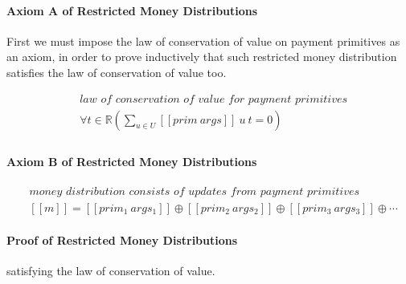 \paragraph{Axiom A of Restricted Money Distributions}

First we must impose the law of conservation of value on payment primitives as an axiom, in order to prove inductively
that such restricted money distribution satisfies the law of conservation of value too.

\begin{equation}
    \begin{split}
        &\textit{law of conservation of value for payment primitives} \\
        &\forall t \in \mathbb{R} ({\displaystyle \sum_{u \in U} [\![prim\ args]\!]\ u\ t = 0}) \\
    \end{split}
\end{equation}

\paragraph{Axiom B of Restricted Money Distributions}

\begin{equation}
    \begin{split}
        &\textit{money distribution consists of updates from payment primitives} \\
        &[\![m]\!] = [\![prim_1\ args_1]\!] \oplus [\![prim_2\ args_2]\!] \oplus [\![prim_3\ args_3]\!] \oplus \dotsb
    \end{split}
\end{equation}

\paragraph{Proof of Restricted Money Distributions}

satisfying the law of conservation of value.

